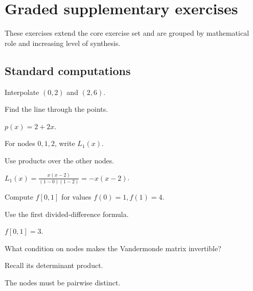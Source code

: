 \section{Graded supplementary exercises}
These exercises extend the core exercise set and are grouped by mathematical role and increasing level of synthesis.

\subsection*{Standard computations}

\begin{exercise}\label{exr:ii20-expand-01}
Interpolate \((0,2)\) and \((2,6)\).
\end{exercise}
\begin{hint}
Find the line through the points.
\end{hint}
\begin{solution}
\(p(x)=2+2x\).
\end{solution}

\begin{exercise}\label{exr:ii20-expand-02}
For nodes \(0,1,2\), write \(L_1(x)\).
\end{exercise}
\begin{hint}
Use products over the other nodes.
\end{hint}
\begin{solution}
\(L_1(x)=\frac{x(x-2)}{(1-0)(1-2)}=-x(x-2)\).
\end{solution}

\begin{exercise}\label{exr:ii20-expand-03}
Compute \(f[0,1]\) for values \(f(0)=1,f(1)=4\).
\end{exercise}
\begin{hint}
Use the first divided-difference formula.
\end{hint}
\begin{solution}
\(f[0,1]=3\).
\end{solution}

\begin{exercise}\label{exr:ii20-expand-04}
What condition on nodes makes the Vandermonde matrix invertible?
\end{exercise}
\begin{hint}
Recall its determinant product.
\end{hint}
\begin{solution}
The nodes must be pairwise distinct.
\end{solution}


